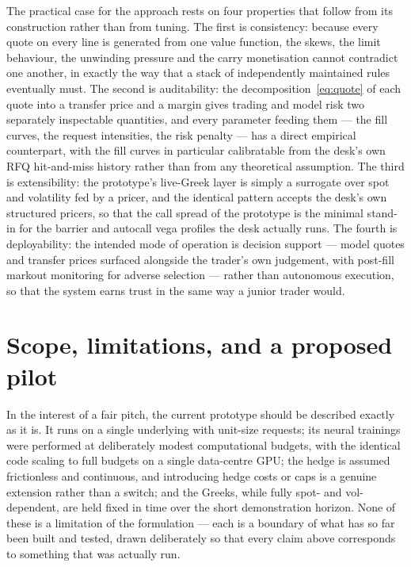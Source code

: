 \documentclass[11pt,a4paper]{article}
\begin{document}
The practical case for the approach rests on four properties that follow
from its construction rather than from tuning. The first is consistency:
because every quote on every line is generated from one value function,
the skews, the limit behaviour, the unwinding pressure and the carry
monetisation cannot contradict one another, in exactly the way that a
stack of independently maintained rules eventually must. The second is
auditability: the decomposition~\eqref{eq:quote} of each quote into a
transfer price and a margin gives trading and model risk two separately
inspectable quantities, and every parameter feeding them --- the fill
curves, the request intensities, the risk penalty --- has a direct
empirical counterpart, with the fill curves in particular calibratable
from the desk's own RFQ hit-and-miss history rather than from any
theoretical assumption. The third is extensibility: the prototype's
live-Greek layer is simply a surrogate over spot and volatility fed by a
pricer, and the identical pattern accepts the desk's own structured
pricers, so that the call spread of the prototype is the minimal
stand-in for the barrier and autocall vega profiles the desk actually
runs. The fourth is deployability: the intended mode of operation is
decision support --- model quotes and transfer prices surfaced alongside
the trader's own judgement, with post-fill markout monitoring for
adverse selection --- rather than autonomous execution, so that the
system earns trust in the same way a junior trader would.

\section{Scope, limitations, and a proposed pilot}

In the interest of a fair pitch, the current prototype should be
described exactly as it is. It runs on a single underlying with
unit-size requests; its neural trainings were performed at deliberately
modest computational budgets, with the identical code scaling to full
budgets on a single data-centre GPU; the hedge is assumed frictionless
and continuous, and introducing hedge costs or caps is a genuine
extension rather than a switch; and the Greeks, while fully spot- and
vol-dependent, are held fixed in time over the short demonstration
horizon. None of these is a limitation of the formulation --- each is a
boundary of what has so far been built and tested, drawn deliberately so
that every claim above corresponds to something that was actually run.
\end{document}

